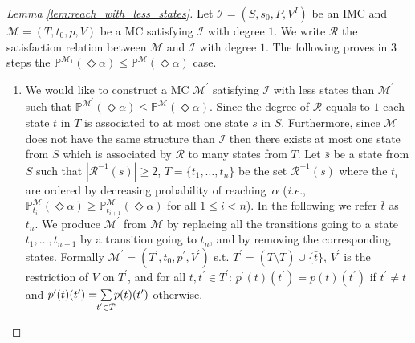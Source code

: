 \documentclass{llncs}
\newcommand{\mc}{\textnormal{MC}}
\newcommand{\imc}{\textnormal{IMC}}
\newcommand{\ie} {{\em i.e.},\ }
\newcommand{\Proba}            {\ensuremath{\mathbb{P}}}
\newcommand{\ssum}[2]{\sum\limits_{\mathclap{#1}^{#2}}}%
\newcommand{\ltlExists}{\ensuremath{\Diamond}}
\begin{document}
\begin{proof}[Lemma \ref{lem:reach_with_less_states}]
	Let $\mathcal{I} = (S,s_0,P,V^I)$ be an {\imc} and
	$\mathcal{M} = (T,t_0,p,V)$ be a {\mc} satisfying $\mathcal{I}$ with degree $1$.
	We write $\mathcal{R}$ the satisfaction relation between $\mathcal{M}$ and $\mathcal{I}$ with degree $1$.
	The following proves in 3 steps the $\Proba^{\mathcal{M}_1}(\ltlExists \alpha) \leq \Proba^{\mathcal{M}}(\ltlExists \alpha)$ case.
		
	\begin{enumerate}
	\item
	We would like to construct a {\mc} $\mathcal{M}^\prime$ satisfying $\mathcal{I}$ 
	with less states than $\mathcal{M}^\prime$
	such that $\Proba^{\mathcal{M}^\prime}(\ltlExists \alpha) \leq \Proba^{\mathcal{M}}(\ltlExists \alpha)$.
%
	Since the degree of $\mathcal{R}$ equals to $1$ each state $t$ in $T$ is associated to at most one state $s$ in $S$.
	Furthermore, since $\mathcal{M}$ does not have the same structure than $\mathcal{I}$
	then there exists at most one state from $S$ which is associated by $\mathcal{R}$ to many states from $T$.
%
	Let 
	$\bar{s}$ be a state from $S$ such that $|\mathcal{R}^{-1}(s)| \geq 2$,
	$\bar{T} = \{t_1, \ldots, t_n\}$ be the set $\mathcal{R}^{-1}(s)$
	where the $t_i$ are ordered by decreasing probability of reaching~$\alpha$
	(\ie
		$\Proba^{\mathcal{M}}_{t_i}(\ltlExists \alpha) \geq \Proba^{\mathcal{M}}_{t_{i+1}}(\ltlExists \alpha)$
		for all $1 \leq i < n$).
	In the following we refer $\bar{t}$ as $t_n$.
	We produce $\mathcal{M}^\prime$ from $\mathcal{M}$ 
	by replacing all the transitions going to a state $t_1, \ldots, t_{n-1}$
	by a transition going to $t_{n}$,
	and by removing the corresponding states.
	Formally $\mathcal{M}^\prime = (T^\prime,t_0,p^\prime,V^\prime)$ s.t. 
	$T^\prime = (T \setminus \bar{T}) \cup \{\bar{t}\}$,
	$V^\prime$ is the restriction of $V$ on $T^\prime$, and
	for all $t,t^\prime \in T^\prime$:
	$p^\prime(t)(t^\prime) = p(t)(t^\prime)$ if $t^\prime \neq \bar{t}$ and 
	$p^\prime(t)(t^\prime) = \ssum{t^\prime \in \bar{T}}{} p(t)(t^\prime)$ otherwise.


\end{enumerate}
\end{proof}
\end{document}
